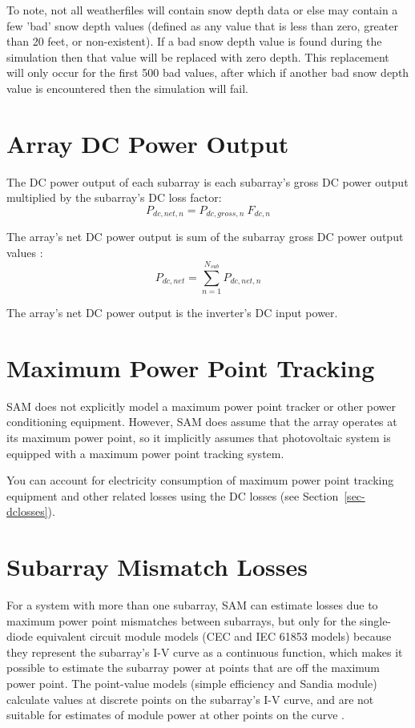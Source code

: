 \documentclass[12pt,letterpaper]{article}
\begin{document}
To note, not all weatherfiles will contain snow depth data or else may contain a few 'bad' snow depth values (defined as any value that is less than zero, greater than 20 feet, or non-existent). If a bad snow depth value is found during the simulation then that value will be replaced with zero depth. This replacement will only occur for the first 500 bad values, after which if another bad snow depth value is encountered then the simulation will fail.


\section{Array DC Power Output}

The DC power output of each subarray is each subarray's gross DC power output multiplied by the subarray's DC loss factor:
\begin{equation}
P_{dc,net,n} = P_{dc,gross,n}~F_{dc,n}
\end{equation}

The array's net DC power output is sum of the subarray gross DC power output values :
\begin{equation}
P_{dc,net} = \sum_{n=1}^{N_{sub}} P_{dc,net,n}
\end{equation}

The array's net DC power output is the inverter's DC input power.

\section{Maximum Power Point Tracking}

SAM does not explicitly model a maximum power point tracker or other power conditioning equipment. However,  SAM does assume that the array operates at its maximum power point, so it implicitly assumes that photovoltaic system is equipped with a maximum power point tracking system. 

You can account for electricity consumption of maximum power point tracking equipment and other related losses using the DC losses (see Section~\ref{sec-dclosses}).

\section{Subarray Mismatch Losses}\label{sec-mismatch}

For a system with more than one subarray, SAM can estimate losses due to maximum power point mismatches between subarrays, but only for the single-diode equivalent circuit module models (CEC and IEC 61853 models) because they represent the subarray's I-V curve as a continuous function, which makes it possible to estimate the subarray power at points that are off the maximum power point. The point-value models (simple efficiency and Sandia module) calculate values at discrete points on the subarray's I-V curve, and are not suitable for estimates of module power at other points on the curve \citep{dobos2012b}.
\end{document}
